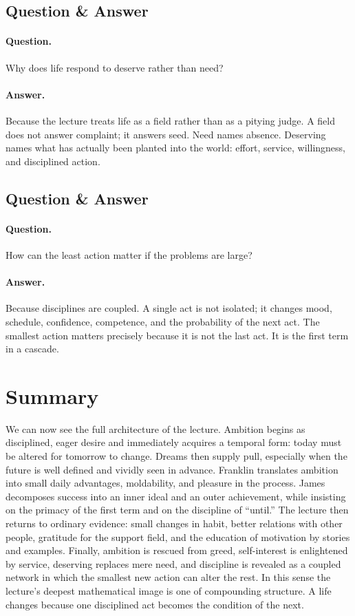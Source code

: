 \subsection{Question \& Answer}

\paragraph{Question.} Why does life respond to deserve rather than need?

\paragraph{Answer.} Because the lecture treats life as a field rather than as a pitying judge. A field does not answer complaint; it answers seed. Need names absence. Deserving names what has actually been planted into the world: effort, service, willingness, and disciplined action.

\subsection{Question \& Answer}

\paragraph{Question.} How can the least action matter if the problems are large?

\paragraph{Answer.} Because disciplines are coupled. A single act is not isolated; it changes mood, schedule, confidence, competence, and the probability of the next act. The smallest action matters precisely because it is not the last act. It is the first term in a cascade.

\section{Summary}

We can now see the full architecture of the lecture. Ambition begins as disciplined, eager desire and immediately acquires a temporal form: today must be altered for tomorrow to change. Dreams then supply pull, especially when the future is well defined and vividly seen in advance. Franklin translates ambition into small daily advantages, moldability, and pleasure in the process. James decomposes success into an inner ideal and an outer achievement, while insisting on the primacy of the first term and on the discipline of ``until.'' The lecture then returns to ordinary evidence: small changes in habit, better relations with other people, gratitude for the support field, and the education of motivation by stories and examples. Finally, ambition is rescued from greed, self-interest is enlightened by service, deserving replaces mere need, and discipline is revealed as a coupled network in which the smallest new action can alter the rest. In this sense the lecture's deepest mathematical image is one of compounding structure. A life changes because one disciplined act becomes the condition of the next.